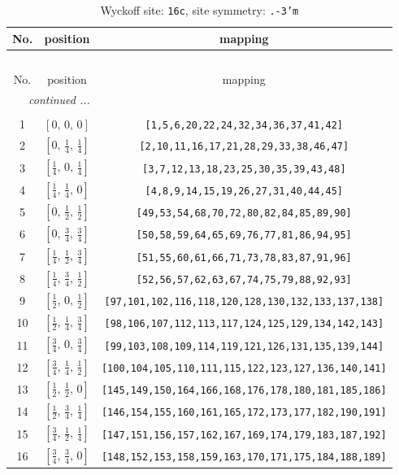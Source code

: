 \documentclass[fleqn,8pt]{jsarticle}
\begin{document}
\begin{longtable}{ccc}
\caption{Wyckoff site: {\tt 16c}, site symmetry: {\tt .-3'm}}
 \\
 \hline \hline
No. & position & mapping \\ \hline \endfirsthead

\multicolumn{2}{l}{\tablename\ \thetable{}} \\
 \hline \hline
No. & position & mapping \\ \hline \endhead

 \hline \hline
\multicolumn{2}{r}{\footnotesize\it continued ...} \\ \endfoot

 \hline \hline
\multicolumn{2}{r}{} \\ \endlastfoot

1 & $\left[ 0,\, 0,\, 0 \right]$ & {\tt [1,5,6,20,22,24,32,34,36,37,41,42]} \\ \hline
2 & $\left[ 0,\, \frac{1}{4},\, \frac{1}{4} \right]$ & {\tt [2,10,11,16,17,21,28,29,33,38,46,47]} \\ \hline
3 & $\left[ \frac{1}{4},\, 0,\, \frac{1}{4} \right]$ & {\tt [3,7,12,13,18,23,25,30,35,39,43,48]} \\ \hline
4 & $\left[ \frac{1}{4},\, \frac{1}{4},\, 0 \right]$ & {\tt [4,8,9,14,15,19,26,27,31,40,44,45]} \\ \hline
5 & $\left[ 0,\, \frac{1}{2},\, \frac{1}{2} \right]$ & {\tt [49,53,54,68,70,72,80,82,84,85,89,90]} \\ \hline
6 & $\left[ 0,\, \frac{3}{4},\, \frac{3}{4} \right]$ & {\tt [50,58,59,64,65,69,76,77,81,86,94,95]} \\ \hline
7 & $\left[ \frac{1}{4},\, \frac{1}{2},\, \frac{3}{4} \right]$ & {\tt [51,55,60,61,66,71,73,78,83,87,91,96]} \\ \hline
8 & $\left[ \frac{1}{4},\, \frac{3}{4},\, \frac{1}{2} \right]$ & {\tt [52,56,57,62,63,67,74,75,79,88,92,93]} \\ \hline
9 & $\left[ \frac{1}{2},\, 0,\, \frac{1}{2} \right]$ & {\tt [97,101,102,116,118,120,128,130,132,133,137,138]} \\ \hline
10 & $\left[ \frac{1}{2},\, \frac{1}{4},\, \frac{3}{4} \right]$ & {\tt [98,106,107,112,113,117,124,125,129,134,142,143]} \\ \hline
11 & $\left[ \frac{3}{4},\, 0,\, \frac{3}{4} \right]$ & {\tt [99,103,108,109,114,119,121,126,131,135,139,144]} \\ \hline
12 & $\left[ \frac{3}{4},\, \frac{1}{4},\, \frac{1}{2} \right]$ & {\tt [100,104,105,110,111,115,122,123,127,136,140,141]} \\ \hline
13 & $\left[ \frac{1}{2},\, \frac{1}{2},\, 0 \right]$ & {\tt [145,149,150,164,166,168,176,178,180,181,185,186]} \\ \hline
14 & $\left[ \frac{1}{2},\, \frac{3}{4},\, \frac{1}{4} \right]$ & {\tt [146,154,155,160,161,165,172,173,177,182,190,191]} \\ \hline
15 & $\left[ \frac{3}{4},\, \frac{1}{2},\, \frac{1}{4} \right]$ & {\tt [147,151,156,157,162,167,169,174,179,183,187,192]} \\ \hline
16 & $\left[ \frac{3}{4},\, \frac{3}{4},\, 0 \right]$ & {\tt [148,152,153,158,159,163,170,171,175,184,188,189]} \\
\end{longtable}
\end{document}
